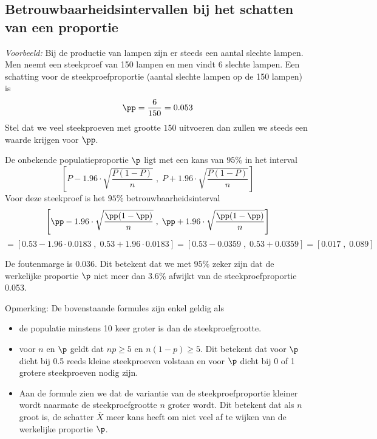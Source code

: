 {\subsection{Betrouwbaarheidsintervallen bij het schatten van een proportie}

{\em Voorbeeld:} Bij de productie van lampen zijn er steeds een aantal slechte lampen.
 Men neemt een steekproef van  150 lampen en men vindt 6 slechte lampen. Een schatting voor de steekproefproportie (aantal slechte lampen op de 150 lampen) is
$$\pp=\frac{6}{150}=0.053$$
Stel dat we veel steekproeven met grootte $150$ uitvoeren dan zullen we steeds een waarde krijgen voor $\pp$. 

 De onbekende populatieproportie $\p$ ligt  met een kans van $95\%$  in het interval $$\left[P-1.96\cdot\sqrt{\frac{P(1-P)}{n}}\;,\; P+1.96\cdot\sqrt{\frac{P(1-P)}{n}}\right]$$ 
Voor deze steekproef is het $95\%$ betrouwbaarheidsinterval
$$\left[\pp-1.96\cdot\sqrt{\frac{\pp(1-\pp)}{n}}\; , \; \pp+1.96\cdot\sqrt{\frac{\pp(1-\pp)}{n}}\right]$$
$$=[0.53-1.96\cdot 0.0183\; ,\; 0.53+1.96\cdot 0.0183]=[0.53-0.0359\; ,\; 0.53+0.0359]=[0.017\; ,\; 0.089]$$ 

De foutenmarge is $0.036$. Dit betekent dat we met  $95\%$ zeker zijn dat de werkelijke proportie $\p$ niet meer dan $3.6\%$ afwijkt van de steekproefproportie 0.053.




{\sc Opmerking:} De bovenstaande formules zijn enkel geldig als 
\begin{itemize}
\item de populatie minstens 10 keer groter is dan de steekproefgrootte.
\item voor $n$ en $\p$ geldt dat $np\geq 5$ en $n(1-p)\geq 5$. Dit betekent dat voor $\p$ dicht bij 0.5 reeds kleine steekproeven volstaan en voor $\p$ dicht bij 0 of 1 grotere steekproeven nodig zijn.
\item Aan de formule zien we dat de variantie van de steekproefproportie kleiner wordt  naarmate de steekproefgrootte $n$ groter wordt. Dit betekent dat als $n$ groot is,  de schatter $\overline{X}$  meer kans heeft om niet veel af te wijken van de werkelijke proportie $\p$. 
\end{itemize}

}
